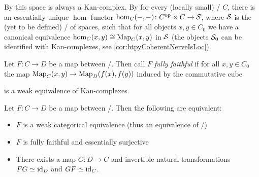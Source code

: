 \begin{remark}\label{rmk:functorialMappingSpace}
    By \cite[116]{cisinski_2019} this space is always a Kan-complex.
    By \cite[248]{cisinski_2019} for every (locally small) \inftycat/ $C$, there is an essentially unique $\hom$-functor $\hom_C(-,-)\colon C^{\operatorname{op}}\times C\to\mathcal{S}$, where $\mathcal{S}$ is the (yet to be defined) \inftycat/ of spaces, such that for all objects $x,y\in C_0$ we have a canonical equivalence $\hom_C(x,y)\cong\operatorname{Map}_C(x,y)$ in $\mathcal{S}$ (the objects $\mathcal{S}_0$ can be identified with Kan-complexes, see \cref{cor:htpyCoherentNerveIsLoc}). %
\end{remark}
\begin{definition}
    Let $F\colon C\to D$ be a map between \inftycats/.
    Then call $F$ \emph{fully faithful} if for all $x,y\in C_0$ the map $\operatorname{Map}_C(x,y)\to\operatorname{Map}_D(f(x),f(y))$ induced by the commutative cube
    \begin{center}
    \end{center}
    is a weak equivalence of Kan-complexes.
\end{definition}
\begin{thm}\label{thm:eqCharEqOfInftycats}
    Let $F\colon C\to D$ be a map between \inftycats/.
    Then the following are equivalent:
    \begin{itemize}
        \item $F$ is a weak categorical equivalence (thus an equivalence of \inftycats/)
        \item $F$ is fully faithful and essentially surjective %
        \item There exists a map $G\colon D\to C$ and invertible natural transformations $FG\simeq \text{id}_D$ and $GF\simeq \text{id}_C$.
    \end{itemize}
    \begin{reference}
        \cite[Corollary 3.6.6 and Theorem 3.9.7]{cisinski_2019}
    \end{reference}
\end{thm}
